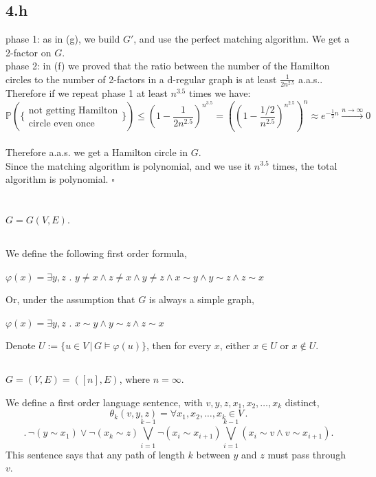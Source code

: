 \documentclass{article}
\begin{document}
\subsection*{4.h}
phase 1: as in (g), we build $G'$, and use the perfect matching algorithm. We get a 2-factor on $G$.\\
phase 2: in (f) we proved that the ratio between the number of the Hamilton circles to the number of 2-factors in a d-regular graph is at least $\frac{1}{2n^{2.5}}$ a.a.s.. Therefore if we repeat phase 1 at least $n^{3.5}$ times we have:
\[
\mathbb{P}(\{\substack{\text{not getting Hamilton} \\ \text{circle even once}}\})\leq(1-\frac{1}{2n^{2.5}})^{n^{3.5}}=((1-\frac{1/2}{n^{2.5}})^{n^{2.5}})^n\approx e^{-\frac{1}{2}n}\xrightarrow{n \to \infty}0
\]\\
Therefore a.a.s. we get a Hamilton circle in $G$.\\
Since the matching algorithm is polynomial, and we use it $n^{3.5}$ times, the total algorithm is polynomial.
\hfill $\square$
\section{}
$G=G(V,E)$.
\subsection{}
We define the following first order formula,

$\varphi(x)=\exists{y,z}$ . $y\neq{x}\land{z\neq{x}}\land{y\neq{z}}\land{x\sim{y}}\land{y\sim{z}}\land{z\sim{x}}$

Or, under the assumption that $G$ is always a simple graph,

$\varphi(x)=\exists{y,z}$ . $x\sim{y}\land{y\sim{z}}\land{z\sim{x}}$

Denote $U:=\{u\in{V}\,|\,{G\vDash\varphi(u)}\}$, then for every $x$, either $x\in{U}$ or $x\notin{U}$.
\subsection{}
$G=(V,E)=([n],E)$, where $n=\infty$.

We define a first order language sentence, with $v,y,z,x_1,x_2,\dots,x_k$ distinct,
\[\theta_k(v,y,z)=\forall{x_1,x_2,\dots,x_k}\in{V}\,.\]\[.\,\neg(y\sim{x_1})\lor\neg(x_k\sim{z})\bigvee_{i=1}^{k-1}\neg(x_i\sim{x_{i+1}})\bigvee_{i=1}^{k-1}(x_i\sim{v}\land{v\sim{x_{i+1}}}).\]
This sentence says that any path of length $k$ between $y$ and $z$ must pass through $v$.
\end{document}
